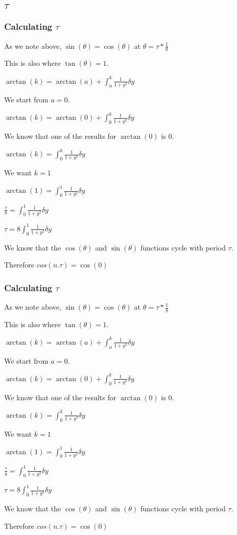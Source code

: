 
\subsection{\(\tau \)}

\subsubsection{Calculating \(\tau \)}

As we note above, \(\sin (\theta )=\cos (\theta )\) at \(\theta =\tau *\frac{1}{8}\)

This is also where \(\tan (\theta )=1\).

\(\arctan (k)=\arctan (a)+\int_a^k\frac{1}{1+y^2} \delta y\)

We start from \(a=0\).

\(\arctan (k)=\arctan (0)+\int_0^k\frac{1}{1+y^2} \delta y\)

We know that one of the results for \(\arctan (0)\) is \(0\).

\(\arctan (k)=\int_0^k\frac{1}{1+y^2} \delta y\)

We want \(k=1\)

\(\arctan (1)=\int_0^1\frac{1}{1+y^2} \delta y\)

\(\frac{\tau }{8}=\int_0^1\frac{1}{1+y^2} \delta y\)

\(\tau =8\int_0^1\frac{1}{1+y^2} \delta y\)

We know that the \(\cos (\theta )\) and \(\sin (\theta )\) functions cycle with period \(\tau \).

Therefore \(cos (n.\tau )=\cos (0)\)

\subsubsection{Calculating \(\tau \)}

As we note above, \(\sin (\theta )=\cos (\theta )\) at \(\theta =\tau *\frac{1}{8}\)

This is also where \(\tan (\theta )=1\).

\(\arctan (k)=\arctan (a)+\int_a^k\frac{1}{1+y^2} \delta y\)

We start from \(a=0\).

\(\arctan (k)=\arctan (0)+\int_0^k\frac{1}{1+y^2} \delta y\)

We know that one of the results for \(\arctan (0)\) is \(0\).

\(\arctan (k)=\int_0^k\frac{1}{1+y^2} \delta y\)

We want \(k=1\)

\(\arctan (1)=\int_0^1\frac{1}{1+y^2} \delta y\)

\(\frac{\tau }{8}=\int_0^1\frac{1}{1+y^2} \delta y\)

\(\tau =8\int_0^1\frac{1}{1+y^2} \delta y\)

We know that the \(\cos (\theta )\) and \(\sin (\theta )\) functions cycle with period \(\tau \).

Therefore \(cos (n.\tau )=\cos (0)\)

